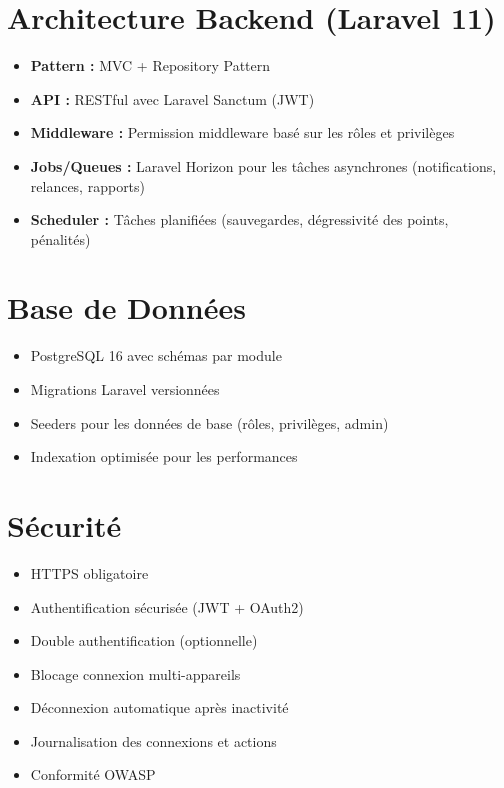 \documentclass[12pt,a4paper]{report}
\begin{document}
\section{Architecture Backend (Laravel 11)}
\begin{itemize}
    \item \textbf{Pattern :} MVC + Repository Pattern
    \item \textbf{API :} RESTful avec Laravel Sanctum (JWT)
    \item \textbf{Middleware :} Permission middleware basé sur les rôles et privilèges
    \item \textbf{Jobs/Queues :} Laravel Horizon pour les tâches asynchrones (notifications, relances, rapports)
    \item \textbf{Scheduler :} Tâches planifiées (sauvegardes, dégressivité des points, pénalités)
\end{itemize}

\section{Base de Données}
\begin{itemize}
    \item PostgreSQL 16 avec schémas par module
    \item Migrations Laravel versionnées
    \item Seeders pour les données de base (rôles, privilèges, admin)
    \item Indexation optimisée pour les performances
\end{itemize}

\section{Sécurité}
\begin{itemize}
    \item HTTPS obligatoire
    \item Authentification sécurisée (JWT + OAuth2)
    \item Double authentification (optionnelle)
    \item Blocage connexion multi-appareils
    \item Déconnexion automatique après inactivité
    \item Journalisation des connexions et actions
    \item Conformité OWASP
\end{itemize}

\end{document}
